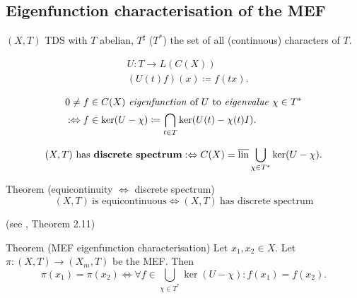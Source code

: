 \subsection{Eigenfunction characterisation of the MEF}
\begin{frame}
  $(X,T)$ TDS with $T$ abelian, $T^\sharp$ ($T^*$) the set of all (continuous) characters of $T$.
\begin{definition}
  \begin{equation*}
    \begin{split}
      &U : T \longrightarrow L(C(X)) \\
      &(U(t) f)(x) \coloneq f(tx).
    \end{split}
  \end{equation*}
   \end{definition}
   \pause
   \begin{definition}
   \begin{equation*}
    \begin{split}
      &0 \neq f \in C(X) \ \text{\emph{eigenfunction} of} \ U \ \text{to \emph{eigenvalue}} \ \chi \in T^*   \\
 &:\Leftrightarrow f \in \ker (U-\chi)\coloneq \bigcap_{t \in T} \ker (U(t)- \chi (t)I).
    \end{split}
      \end{equation*}
   \end{definition}
\end{frame}
\begin{frame}[fragile]
 \begin{definition}
  \begin{equation*}
    (X,T) \ \text{has \textbf{discrete spectrum}}:\Leftrightarrow C(X) = \overline{\operatorname{lin}} \bigcup_{\chi \in T^*} \ker (U- \chi).
  \end{equation*}
\end{definition}
\pause 
  \begin{alertblock}{Theorem (equicontinuity $\Leftrightarrow$ discrete spectrum)}%
  \begin{equation*}
    (X,T) \ \text{is equicontinuous} \Leftrightarrow (X,T) \ \text{has discrete spectrum}
  \end{equation*}

    \hfill(see \cite{HK2023}, Theorem 2.11)
\end{alertblock}
\pause
  \begin{alertblock}{Theorem (MEF eigenfunction characterisation)}
  \label{thm:MEF_EFchar}
  Let $x_1,x_2 \in X$. Let $\pi : (X,T) \to (X_m,T)$ be the MEF.
  Then
  \begin{equation*}
  \pi (x_1) = \pi (x_2) \Leftrightarrow 
    \forall f \in \bigcup_{\chi \in T^*} \ker (U- \chi) : f(x_1) = f(x_2).
  \end{equation*}
\end{alertblock}
\end{frame}
